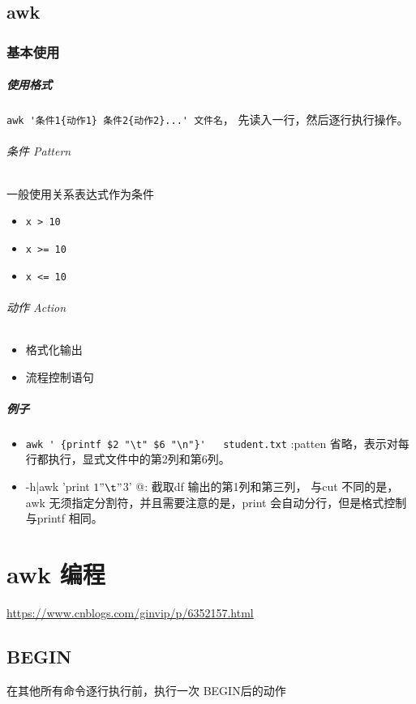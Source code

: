 \documentclass[UTF8,a4paper,12pt]{ctexbook}
\begin{document}
	\section{awk}
		\subsection{基本使用}
			\paragraph{使用格式}
				\verb|awk '条件1{动作1} 条件2{动作2}...' 文件名|， 先读入一行，然后逐行执行操作。
				
				\subparagraph{条件 Pattern}一般使用关系表达式作为条件
					\begin{itemize}[itemindent = 1em]
						\item \verb|x > 10|
						\item \verb|x >= 10|
						\item \verb|x <= 10|
					\end{itemize}
			
				\subparagraph{动作 Action}
					\begin{itemize}[itemindent = 1em]
						\item 格式化输出
						\item 流程控制语句
					\end{itemize}
			
			\paragraph{例子}
				\begin{itemize}
					\item \verb|awk ' {printf $2 "\t" $6 "\n"}'   student.txt|  :patten 省略，表示对每行都执行，显式文件中的第2列和第6列。
					\item \verb@df -h|awk '{print $1 "\t" $3}' @: 截取df 输出的第1列和第三列， 与cut 不同的是，awk 无须指定分割符，并且需要注意的是，print 会自动分行，但是格式控制与printf 相同。
				\end{itemize}
				
		
\chapter{awk 编程}
	\url{https://www.cnblogs.com/ginvip/p/6352157.html}

	\section{BEGIN} 在其他所有命令逐行执行前，执行一次 BEGIN后的动作
	
\end{document}
